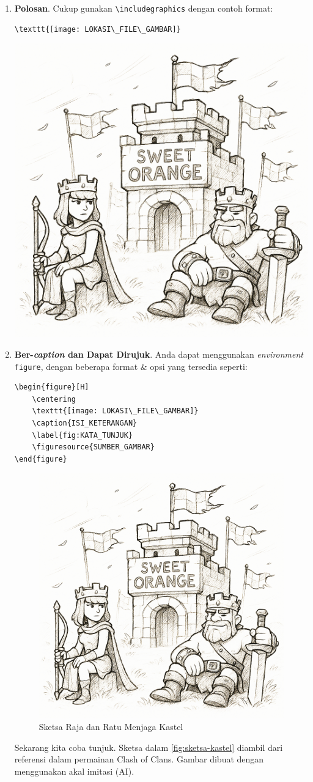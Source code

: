 \begin{enumerate}[]
    \item \textbf{Polosan}. Cukup gunakan \verb|\includegraphics| dengan contoh format:
    \begin{lstlisting}
\texttt{[image: LOKASI\_FILE\_GAMBAR]}
    \end{lstlisting}
    
    \begin{center}
        \includegraphics[width=.5\linewidth]{image/Sweet Orange Castle.jpg}
    \end{center}
    
    \item \textbf{Ber-\textit{caption} dan Dapat Dirujuk}. Anda dapat menggunakan \textit{environment} \texttt{figure}, dengan beberapa format \& opsi yang tersedia seperti:
    \begin{lstlisting}
\begin{figure}[H]
    \centering
    \texttt{[image: LOKASI\_FILE\_GAMBAR]}
    \caption{ISI_KETERANGAN}
    \label{fig:KATA_TUNJUK}
    \figuresource{SUMBER_GAMBAR}
\end{figure}
    \end{lstlisting}
    
    \begin{figure}[H]
        \centering
        \includegraphics[width=.5\linewidth]{image/Sweet Orange Castle.jpg}
        \caption{Sketsa Raja dan Ratu Menjaga Kastel}
        \label{fig:sketsa-kastel}
    \end{figure}
    
    Sekarang kita coba tunjuk. Sketsa dalam \autoref{fig:sketsa-kastel} diambil dari referensi dalam permainan Clash of Clans. Gambar dibuat dengan menggunakan akal imitasi (AI).
\end{enumerate}

